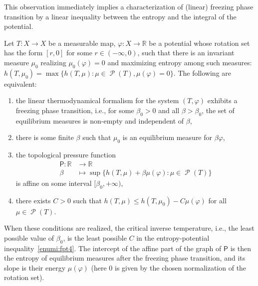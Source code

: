 \documentclass[10pt]{amsart}
\theoremstyle{definition}\newtheorem{defi}[theo]{Definition}\newtheorem{rema}[theo]{Remark}\newtheorem{exam}[theo]{Example}\newtheorem{exem}[theo]{Example}\newtheorem{nota}[theo]{Notation}
\theoremstyle{plain}
\theoremstyle{plain}
\newcommand\Prob{{\operatorname{\mathscr{P}}}}
\newcommand{\Pf}{\mathsf{P}}
\newcommand{\pot}{\varphi}
\newcommand*\8{\infty}
\newcommand\RR{\mathbb{R}}
\newcommand*{\romanenumi}{\renewcommand*{\theenumi}{\roman{enumi}}}
\begin{document}
This observation immediately implies a characterization of (linear) freezing phase transition by a linear inequality between the entropy and the integral of the potential.

\begin{prop}\label{prop-fpt}
Let $T:X\to X$ be a measurable map, $\pot:X\to\RR$ be a potential whose rotation set has the form $[r,0]$ for some $r\in(-\infty,0)$, such that there is an invariant measure $\mu_0$ realizing $\mu_0(\pot) = 0$ and maximizing entropy among such measures: $h(T,\mu_0)=\max \{h(T,\mu) \colon \mu\in \Prob(T), \mu(\pot)=0\}$. The following are equivalent:
\begin{enumerate}\romanenumi
\item\label{enumi:fpt1}
the linear thermodynamical formalism for the system $(T,\pot)$ exhibits a freezing phase transition, i.e., for some $\beta_0>0$ and all $\beta>\beta_0$, the set of equilibrium measures is non-empty and independent of $\beta$,
\item\label{enumi:fpt2}
there is some finite $\beta$ such that $\mu_0$ is an equilibrium measure for $\beta\pot$,
\item\label{enumi:fpt3}
the topological pressure function
\begin{align*}
\Pf \colon \RR &\to \RR \\
\beta &\mapsto \sup \{ h(T,\mu) + \beta\mu(\pot) \colon \mu\in\Prob(T) \}
\end{align*}
is affine on some interval $[\beta_0,+\infty)$,
\item\label{enumi:fpt4}
there exists $C>0$ such that $h(T,\mu) \le h(T,\mu_0) -C \mu(\pot)$ for all $\mu\in\Prob(T)$.
\end{enumerate}
When these conditions are realized, the critical inverse temperature, i.e., the least possible value of $\beta_0$, is the least possible $C$ in the entropy-potential inequality~\eqref{enumi:fpt4}. The intercept of the affine part of the graph of $\Pf$ is then the entropy of equilibrium measures after the freezing phase transition, and its slope is their energy $\mu(\pot)$ (here $0$ is given by the chosen normalization of the rotation set).
\end{prop}
\end{document}
